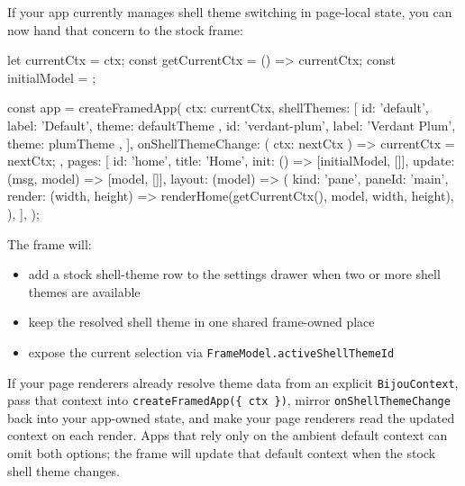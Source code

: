 If your app currently manages shell theme switching in page-local state, you can now hand that concern to the stock frame:

\begin{CodeBlock}
let currentCtx = ctx;
const getCurrentCtx = () => currentCtx;
const initialModel = {};

const app = createFramedApp({
  ctx: currentCtx,
  shellThemes: [
    { id: 'default', label: 'Default', theme: defaultTheme },
    { id: 'verdant-plum', label: 'Verdant Plum', theme: plumTheme },
  ],
  onShellThemeChange: ({ ctx: nextCtx }) => {
    currentCtx = nextCtx;
  },
  pages: [{
    id: 'home',
    title: 'Home',
    init: () => [initialModel, []],
    update: (msg, model) => [model, []],
    layout: (model) => ({
      kind: 'pane',
      paneId: 'main',
      render: (width, height) => renderHome(getCurrentCtx(), model, width, height),
    }),
  }],
});
\end{CodeBlock}

The frame will:

\begin{itemize}
\tightlist
\item
  add a stock shell-theme row to the settings drawer when two or more shell themes are available
\item
  keep the resolved shell theme in one shared frame-owned place
\item
  expose the current selection via \texttt{F\allowbreak{}r\allowbreak{}a\allowbreak{}m\allowbreak{}e\allowbreak{}M\allowbreak{}o\allowbreak{}d\allowbreak{}e\allowbreak{}l\allowbreak{}.\allowbreak{}a\allowbreak{}c\allowbreak{}t\allowbreak{}i\allowbreak{}v\allowbreak{}e\allowbreak{}S\allowbreak{}h\allowbreak{}e\allowbreak{}l\allowbreak{}l\allowbreak{}T\allowbreak{}h\allowbreak{}e\allowbreak{}m\allowbreak{}e\allowbreak{}I\allowbreak{}d}
\end{itemize}

If your page renderers already resolve theme data from an explicit \texttt{B\allowbreak{}i\allowbreak{}j\allowbreak{}o\allowbreak{}u\allowbreak{}C\allowbreak{}o\allowbreak{}n\allowbreak{}t\allowbreak{}e\allowbreak{}x\allowbreak{}t}, pass that context into \texttt{c\allowbreak{}r\allowbreak{}e\allowbreak{}a\allowbreak{}t\allowbreak{}e\allowbreak{}F\allowbreak{}r\allowbreak{}a\allowbreak{}m\allowbreak{}e\allowbreak{}d\allowbreak{}A\allowbreak{}p\allowbreak{}p\allowbreak{}(\allowbreak{}\{\allowbreak{} \allowbreak{}c\allowbreak{}t\allowbreak{}x\allowbreak{} \allowbreak{}\}\allowbreak{})}, mirror \texttt{o\allowbreak{}n\allowbreak{}S\allowbreak{}h\allowbreak{}e\allowbreak{}l\allowbreak{}l\allowbreak{}T\allowbreak{}h\allowbreak{}e\allowbreak{}m\allowbreak{}e\allowbreak{}C\allowbreak{}h\allowbreak{}a\allowbreak{}n\allowbreak{}g\allowbreak{}e} back into your app-owned state, and make your page renderers read the updated context on each render. Apps that rely only on the ambient default context can omit both options; the frame will update that default context when the stock shell theme changes.

